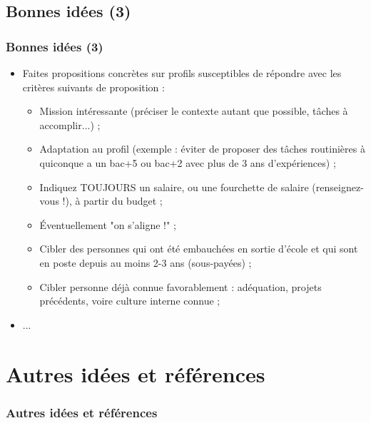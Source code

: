 \documentclass[slidetop,11pt]{beamer}
\begin{document}
\subsection{Bonnes id{\'e}es (3)}
\begin{frame}
	\frametitle{Bonnes id{\'e}es (3)}
	\begin{itemize}
		\item Faites propositions concr{\`e}tes sur profils susceptibles de r{\'e}pondre avec les crit{\`e}res suivants de proposition :
		\begin{itemize}
			\item Mission int{\'e}ressante (pr{\'e}ciser le contexte autant que possible, t{\^a}ches {\`a} accomplir...) ; 
			\item Adaptation au profil (exemple : {\'e}viter de proposer des t{\^a}ches routini{\`e}res {\`a} quiconque a un bac+5 ou bac+2 avec plus de 3 ans d'exp{\'e}riences) ; 
			\item Indiquez TOUJOURS un salaire, ou une fourchette de salaire (renseignez-vous !), {\`a} partir du budget ; 
			\item {\'E}ventuellement "on s'aligne !" ; 
			\item Cibler des personnes qui ont {\'e}t{\'e} embauch{\'e}es en sortie d'{\'e}cole 
				et qui sont en poste depuis au moins 2-3 ans (sous-pay{\'e}es) ;
			\item Cibler personne d{\'e}j{\`a} connue favorablement : ad{\'e}quation, projets pr{\'e}c{\'e}dents, voire culture interne connue ; 
		\end{itemize} 
		\item ...
	\end{itemize} 
\end{frame}


\section{Autres id{\'e}es et r{\'e}f{\'e}rences}
\begin{frame}
	\frametitle{Autres id{\'e}es et r{\'e}f{\'e}rences}
	\tableofcontents[sections=4,currentsection,subsectionstyle=show/shaded/hide] %
\end{frame}
\end{document}
